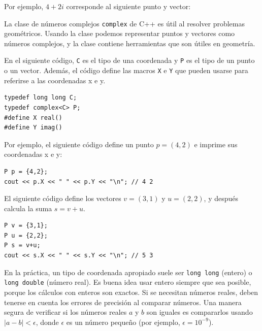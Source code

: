 Por ejemplo, $4+2i$ corresponde al
siguiente punto y vector:

\begin{center}
\end{center}


La clase de números complejos \texttt{complex} de C++ es
útil al resolver problemas geométricos.
Usando la clase podemos representar puntos y vectores
como números complejos, y la clase contiene herramientas
que son útiles en geometría.

En el siguiente código, \texttt{C} es el tipo de
una coordenada y \texttt{P} es el tipo de un punto o un vector.
Además, el código define las macros \texttt{X} e \texttt{Y}
que pueden usarse para referirse a las coordenadas x e y.

\begin{lstlisting}
typedef long long C;
typedef complex<C> P;
#define X real()
#define Y imag()
\end{lstlisting}

Por ejemplo, el siguiente código define un punto $p=(4,2)$
e imprime sus coordenadas x e y:

\begin{lstlisting}
P p = {4,2};
cout << p.X << " " << p.Y << "\n"; // 4 2
\end{lstlisting}

El siguiente código define los vectores $v=(3,1)$ y $u=(2,2)$,
y después calcula la suma $s=v+u$.

\begin{lstlisting}
P v = {3,1};
P u = {2,2};
P s = v+u;
cout << s.X << " " << s.Y << "\n"; // 5 3
\end{lstlisting}

En la práctica,
un tipo de coordenada apropiado suele ser
\texttt{long long} (entero) o \texttt{long double}
(número real).
Es buena idea usar entero siempre que sea posible,
porque los cálculos con enteros son exactos.
Si se necesitan números reales,
deben tenerse en cuenta los errores de precisión
al comparar números.
Una manera segura de verificar si los números reales $a$ y $b$ son iguales
es compararlos usando $|a-b|<\epsilon$,
donde $\epsilon$ es un número pequeño (por ejemplo, $\epsilon=10^{-9}$).

